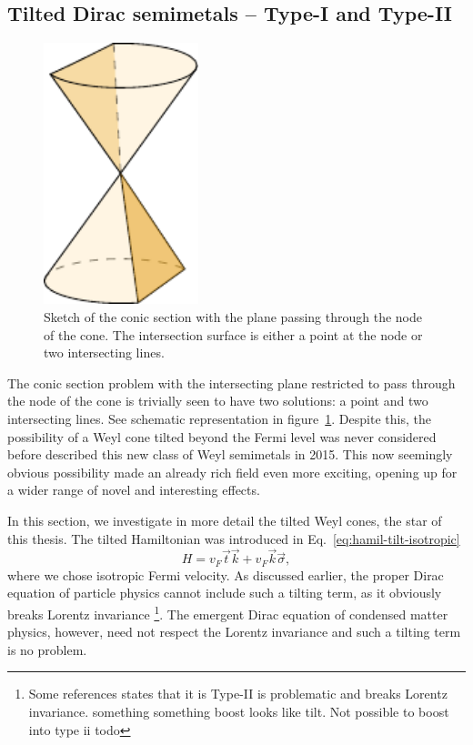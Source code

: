 \subsection{Tilted Dirac semimetals -- Type-I and Type-II}
\label{sec:typeii}

\begin{figure}[ht]
  \centering
  \includegraphics[width=0.4\textwidth]{figures/conicSection}
  \caption{Sketch of the conic section with the plane passing through the node of the cone. The intersection surface is either a point at the node or two intersecting lines. \label{fig:conic-section-sketch}}
\end{figure}

The conic section problem with the intersecting plane restricted to pass through the node of the cone is trivially seen to have two solutions: a point and two intersecting lines.
See schematic representation in figure~\ref{fig:conic-section-sketch}.
Despite this, the possibility of a Weyl cone tilted beyond the Fermi level was never considered before \textcite{soluyanovTypeIIWeylSemimetals2015} described this new class of Weyl semimetals in 2015.
This now seemingly obvious possibility made an already rich field even more exciting, opening up for a wider range of novel and interesting effects.

In this section, we investigate in more detail the tilted Weyl cones, the star of this thesis.
The tilted Hamiltonian was introduced in Eq.~\eqref{eq:hamil-tilt-isotropic}
\[
H = v_F \vec{t} \vec{k} + v_F \vec{k} \vec{\sigma},
\]
where we chose isotropic Fermi velocity.
As discussed earlier, the proper Dirac equation of particle physics cannot include such a tilting term, as it obviously breaks Lorentz invariance
\footnote{Some references states that it is Type-II is problematic and breaks Lorentz invariance.
  something something boost looks like tilt.
  Not possible to boost into type ii
todo}.
The emergent Dirac equation of condensed matter physics, however, need not respect the Lorentz invariance and such a tilting term is no problem.

